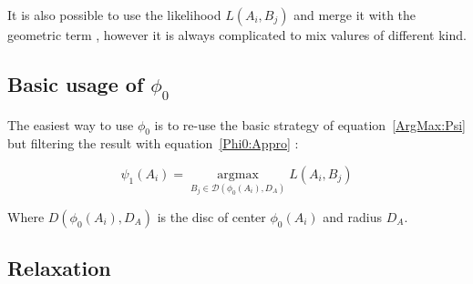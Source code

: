 It is also possible to use the likelihood $L(A_i,B_j)$ and merge it with the geometric term , 
however it is always complicated to mix valures of different kind.


\subsection{Basic usage of $\phi_0$}

The easiest way to use $\phi_0$ is to re-use the basic strategy of 
equation~\ref{ArgMax:Psi} but filtering the result with  equation~\ref{Phi0:Appro}  :


\begin{equation}
   \psi_1(A_i) =  \underset{B_j \in \mathcal D(\phi_0(A_i),D_A)}{\operatorname{argmax}}  L(A_i,B_j) 
\end{equation}

Where  $D(\phi_0(A_i),D_A)$ is  the disc of center $\phi_0(A_i)$ and radius $D_A$.

\label{Basic:ArgMax}

\subsection{Relaxation}





